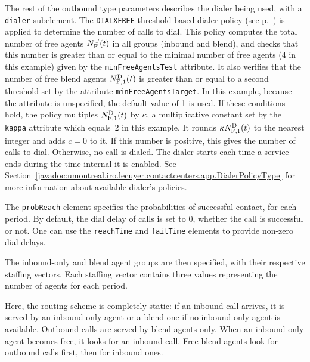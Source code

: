The rest of the outbound type parameters describes the dialer being
used, with a \texttt{dialer} subelement.
The \texttt{DIALXFREE} threshold-based dialer policy (see
p.~\pageref{javadoc:umontreal.iro.lecuyer.contactcenters.app.DialerPolicyType:DIALXFREE})
is applied to
determine the number of calls to dial.
This policy computes the total number of free agents $\Ntf(t)$ in all groups
(inbound and blend), and checks that this number is
greater than or equal to the minimal number of free agents (4 in this
example) given by the
\texttt{min\-Free\-Agents\-Test} attribute.
It also verifies that the number of free blend agents $\Ndf[1](t)$
is greater than or equal to a second threshold set by the attribute
\texttt{min\-Free\-Agents\-Target}.
In this example, because the attribute is unspecified, the default value of 1 is used.
If these conditions hold,
the policy multiples $\Ndf[1](t)$ by $\kappa$, a multiplicative
constant
set by the \texttt{kappa} attribute which
equals~2 in this example.
It rounds $\kappa\Ndf[1](t)$ to the nearest integer and adds $c=0$ to it.
If this number is positive, this gives the number of calls to dial.
Otherwise, no call is dialed.
The dialer starts each time a service ends during the time internal it
is enabled.
See
Section~\ref{javadoc:umontreal.iro.lecuyer.contactcenters.app.DialerPolicyType}
for more information about available dialer's policies.

The \texttt{prob\-Reach} element
specifies the probabilities of successful contact, for each period.
By default, the dial delay of calls is set to 0, whether the call is successful or
not.  One can use the \texttt{reach\-Time} and \texttt{fail\-Time}
elements to provide non-zero dial delays.

The inbound-only and blend agent groups are then specified, with their
respective staffing vectors.  Each staffing vector contains three
values representing the number of agents for each period.

Here, the routing scheme is completely static:
if an inbound call arrives, it is served by an inbound-only agent or a
blend one if no inbound-only agent is available.
Outbound calls are served by blend agents only.
When an inbound-only agent becomes free, it looks for an inbound call.
Free blend agents look for outbound calls first, then for inbound ones.

